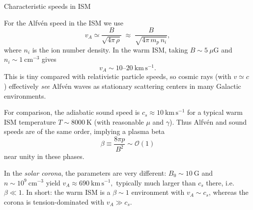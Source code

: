 \begin{remark}{Characteristic speeds in ISM}

For the Alfv\'en speed in the ISM we use
\[
v_A \simeq \frac{B}{\sqrt{4\pi\,\rho}}
\;\approx\;
\frac{B}{\sqrt{4\pi\,m_p\,n_i}},
\]
where \(n_i\) is the ion number density.  
In the warm ISM, taking \(B \sim 5~\mu\mathrm{G}\) and \(n_i \sim 1~\mathrm{cm^{-3}}\) gives
\[
v_A \sim 10\text{--}20~\mathrm{km\,s^{-1}}.
\]
This is tiny compared with relativistic particle speeds, so cosmic rays (with \(v\simeq c\)) effectively \emph{see} Alfv\'en waves as stationary scattering centers in many Galactic environments.

For comparison, the adiabatic sound speed
is \(c_s \approx 10~\mathrm{km\,s^{-1}}\) for a typical warm ISM temperature \(T\!\sim\!8000~\mathrm{K}\) (with reasonable \(\mu\) and \(\gamma\)). Thus Alfv\'en and sound speeds are of the same order, implying a plasma beta
\[
\beta \equiv \frac{8\pi p}{B^2} \sim \mathcal O (1)
\]
near unity in these phases.

In the \emph{solar corona}, the parameters are very different: \(B_0\!\sim\!10~\mathrm{G}\) and \(n\!\sim\!10^9~\mathrm{cm^{-3}}\) yield
\( 
v_A \approx 690~\mathrm{km\,s^{-1}},
\)
typically much larger than \(c_s\) there, i.e.\ \(\beta \ll 1\). In short: the warm ISM is a \(\beta\!\sim\!1\) environment with \(v_A\!\sim\!c_s\), whereas the corona is tension-dominated with \(v_A\!\gg\!c_s\).
\end{remark}

